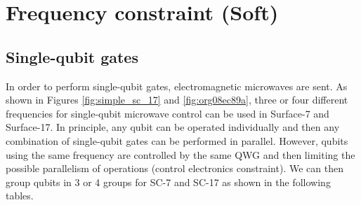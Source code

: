 \documentclass[11pt]{article}
\begin{document}









\section{Frequency constraint (Soft)}
\label{sec:orgff4c391}

\subsection{Single-qubit gates}

In order to perform single-qubit gates, electromagnetic microwaves are sent. As shown in Figures \ref{fig:simple_sc_17} and \ref{fig:org08ec89a}, three or four different frequencies for single-qubit microwave control can be used in Surface-7 and Surface-17. In principle, any qubit can be operated individually and then any combination of single-qubit gates can be performed in parallel. However, qubits using the same frequency are controlled by the same QWG and then limiting the possible parallelism of operations (control electronics constraint). We can then group qubits in 3 or 4 groups for SC-7 and SC-17 as shown in the following tables.
\end{document}

